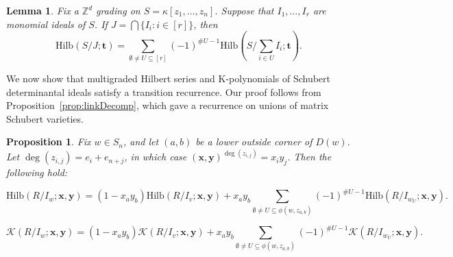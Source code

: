 \documentclass[12pt,reqno]{amsart}
\newtheorem{proposition}[theorem]{Proposition}
\newtheorem{lemma}[theorem]{Lemma}
\newtheorem{Main Conjecture}[theorem]{Main Conjecture}
\theoremstyle{remark}
\theoremstyle{plain}
\newcommand{\hilb}{\mbox{Hilb}}
\begin{document}
\begin{lemma} \label{lemma:hilbertIntersection}
Fix a $\mathbb Z^d$ grading on $S=\kappa[z_1,\ldots,z_n]$.  Suppose that $I_1,\ldots,I_r$ are monomial ideals of $S$.  If $J=\bigcap\{ I_{i}:i \in [r]\}$,
then
\[\hilb(S/J;\mathbf t)=\sum_{\emptyset \neq U\subseteq [r]} (-1)^{\#U-1}\hilb\left (S/\sum_{i\in U}I_i;\mathbf t\right ). \]
\end{lemma}


We now show that multigraded Hilbert series and K-polynomials of Schubert determinantal ideals satisfy a transition recurrence.  Our proof follows from Proposition~\ref{prop:linkDecomp}, which gave a recurrence on unions of matrix Schubert varieties.
\begin{proposition}
\label{prop:hilbertAndKPoly}
Fix $w\in S_n$, and let $(a,b)$ be a lower outside corner of $D(w)$.  Let $\deg(z_{i,j}) = e_i+e_{n+j}$, in which case $(\mathbf{x,y})^{\deg(z_{i,j})} = x_iy_j$.  Then the following hold:
\begin{thmlist}
    \item\label{proppart:hilbRecursion} \[\hilb(R/I_w;\mathbf x,\mathbf y)=\left(1-x_ay_b\right)\hilb(R/I_v;\mathbf x,\mathbf y)+x_ay_b\sum_{\emptyset \neq U\subseteq \phi(w,z_{a,b})}(-1)^{\#U-1}\hilb(R/I_{w_U};\mathbf x,\mathbf y).\]
    \item \label{proppart:KpolyRecursion} \[\mathcal K(R/I_w;\mathbf x,\mathbf y)=\left(1-x_ay_b\right)\mathcal K(R/I_v;\mathbf x,\mathbf y)+x_ay_b\sum_{\emptyset \neq U\subseteq \phi(w,z_{a,b})}(-1)^{\#U-1}\mathcal K(R/I_{w_U};\mathbf x,\mathbf y).\]
\end{thmlist}
\end{proposition}
\end{document}
